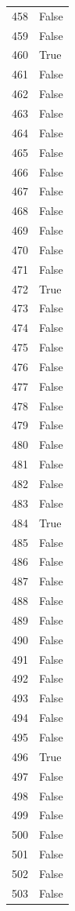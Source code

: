 \documentclass[
  letterpaper,
  DIV=11,
  numbers=noendperiod]{scrreprt}
\begin{document}
\begin{tabular}{ll}
458  &  False \\
459  &  False \\
460  &   True \\
461  &  False \\
462  &  False \\
463  &  False \\
464  &  False \\
465  &  False \\
466  &  False \\
467  &  False \\
468  &  False \\
469  &  False \\
470  &  False \\
471  &  False \\
472  &   True \\
473  &  False \\
474  &  False \\
475  &  False \\
476  &  False \\
477  &  False \\
478  &  False \\
479  &  False \\
480  &  False \\
481  &  False \\
482  &  False \\
483  &  False \\
484  &   True \\
485  &  False \\
486  &  False \\
487  &  False \\
488  &  False \\
489  &  False \\
490  &  False \\
491  &  False \\
492  &  False \\
493  &  False \\
494  &  False \\
495  &  False \\
496  &   True \\
497  &  False \\
498  &  False \\
499  &  False \\
500  &  False \\
501  &  False \\
502  &  False \\
503  &  False \\

\end{tabular}
\end{document}
